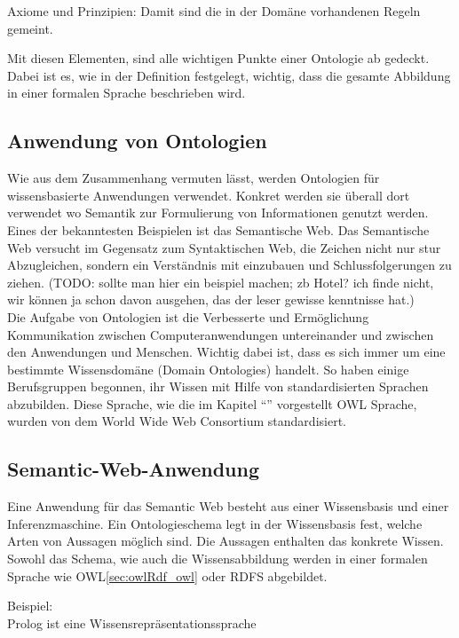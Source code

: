 Axiome und Prinzipien: Damit sind die in der Domäne vorhandenen Regeln gemeint.

Mit diesen Elementen, sind alle wichtigen Punkte einer Ontologie ab gedeckt. Dabei ist es, wie in der Definition festgelegt, wichtig, dass die gesamte Abbildung in einer formalen Sprache beschrieben wird.


\subsection{Anwendung von Ontologien}
\label{subsec:ontologien_onto_anwendung}
Wie aus dem Zusammenhang vermuten lässt, werden Ontologien für wissensbasierte Anwendungen verwendet. Konkret werden sie überall dort verwendet wo Semantik zur Formulierung von Informationen genutzt werden. Eines der bekanntesten Beispielen ist das Semantische Web. Das Semantische Web versucht im Gegensatz zum Syntaktischen Web, die Zeichen nicht nur stur Abzugleichen, sondern ein Verständnis mit einzubauen und Schlussfolgerungen zu ziehen. (TODO: sollte man hier ein beispiel machen; zb Hotel? ich finde nicht, wir können ja schon davon ausgehen, das der leser gewisse kenntnisse hat.)\\

Die Aufgabe von Ontologien ist die Verbesserte und Ermöglichung Kommunikation zwischen Computeranwendungen untereinander und zwischen den Anwendungen und Menschen. Wichtig dabei ist, dass es sich immer um eine bestimmte Wissensdomäne (Domain Ontologies) handelt. So haben einige Berufsgruppen begonnen, ihr Wissen mit Hilfe von standardisierten Sprachen abzubilden. Diese Sprache, wie die im Kapitel "`"' vorgestellt OWL Sprache, wurden von dem World Wide Web Consortium standardisiert.



\subsection{Semantic-Web-Anwendung}
\label{subsec:ontologien_onto_SemantikWebAnwendung}
Eine Anwendung für das Semantic Web besteht aus einer Wissensbasis und einer Inferenzmaschine. Ein Ontologieschema legt in der Wissensbasis fest, welche Arten von Aussagen möglich sind. Die Aussagen enthalten das konkrete Wissen. Sowohl das Schema, wie auch die Wissensabbildung werden in einer formalen Sprache wie OWL\ref{sec:owlRdf_owl} oder RDFS abgebildet.

Beispiel:\\
\noindent\hspace*{15mm} Prolog ist eine Wissensrepräsentationssprache\\


